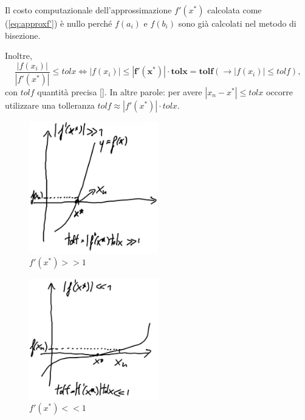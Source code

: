 \begin{remark}
	Il costo computazionale dell'approssimazione $f'(x^*)$ calcolata come (\ref{eq:approxf'}) è nullo perché $f(a_i)$ e $f(b_i)$ sono già calcolati nel metodo di bisezione.
\end{remark}

Inoltre,
\begin{equation*}
	\frac{|f(x_i)|}{|f'(x^*)|}\leq tolx \iff |f(x_i)|\leq \boldsymbol{|f'(x^*)|\cdot tolx=tolf}(\rightarrow |f(x_i)|\leq tolf),
\end{equation*}
con ${tolf}$ quantità precisa [\footnotemark]. In altre parole: per avere $|x_n-x^*|\leq tolx$ occorre utilizzare una tolleranza $tolf\approx|f'(x^*)|\cdot tolx$.

\begin{figure}
	\centering
	\includegraphics[width=0.5\textwidth]{immagini/f1(xStar)major1.jpg}
	\caption{\label{fig:f1(xStar)major1.jpg}$f'(x^*)>>1$}
\end{figure}
\begin{figure}
	\centering
	\includegraphics[width=0.5\textwidth]{immagini/f1(xStar)minor1.jpg}
	\caption{\label{fig:f1(xStar)minor1.jpg} $f'(x^*)<<1$}
\end{figure}

